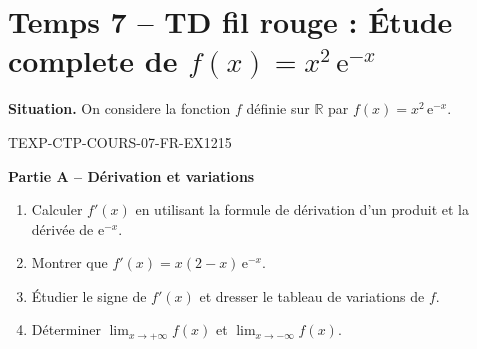 

\section*{Temps 7 -- TD fil rouge : Étude complete de $f(x) = x^2\,\mathrm{e}^{-x}$}

\textbf{Situation.} On considere la fonction $f$ définie sur $\mathbb{R}$ par $f(x) = x^2\,\mathrm{e}^{-x}$.

\bigskip


\begin{exercice}{TEXP-CTP-COURS-07-FR-EX1}{2}{15}

\textbf{Partie A -- Dérivation et variations}

\begin{enumerate}
  \item Calculer $f'(x)$ en utilisant la formule de dérivation d'un produit et la dérivée de $\mathrm{e}^{-x}$.
  \item Montrer que $f'(x) = x(2-x)\,\mathrm{e}^{-x}$.
  \item Étudier le signe de $f'(x)$ et dresser le tableau de variations de $f$.
  \item Déterminer $\lim_{x \to +\infty} f(x)$ et $\lim_{x \to -\infty} f(x)$.
\end{enumerate}

\end{exercice}

